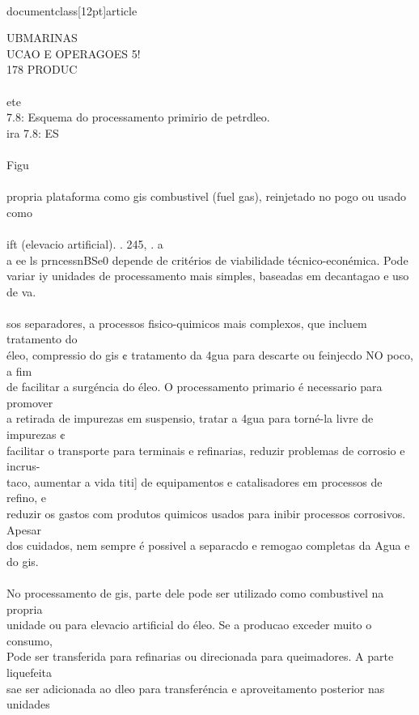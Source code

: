 \\documentclass[12pt]{article}
\begin{document}
{UBMARINAS\\
UCAO E OPERAGOES 5!\\
178 PRODUC\\
\\
ete\\
7.8: Esquema do processamento primirio de petrdleo.\\
ira 7.8: ES\\
\\
Figu\\
\\
propria plataforma como gis combustivel (fuel gas), reinjetado no pogo ou usado como\\
\\
ift (elevacio artificial). . 245, . a\\
a ee ls prncessnBSe0 depende de critérios de viabilidade técnico-econémica. Pode\\
variar iy unidades de processamento mais simples, baseadas em decantagao e uso de va.\\
\\
sos separadores, a processos fisico-quimicos mais complexos, que incluem tratamento do\\
éleo, compressio do gis ¢ tratamento da 4gua para descarte ou feinjecdo NO poco, a fim\\
de facilitar a surgéncia do éleo. O processamento primario é necessario para promover\\
a retirada de impurezas em suspensio, tratar a 4gua para torné-la livre de impurezas ¢\\
facilitar o transporte para terminais e refinarias, reduzir problemas de corrosio e incrus-\\
taco, aumentar a vida titi] de equipamentos e catalisadores em processos de refino, e\\
reduzir os gastos com produtos quimicos usados para inibir processos corrosivos. Apesar\\
dos cuidados, nem sempre é possivel a separacdo e remogao completas da Agua e do gis.\\
\\
No processamento de gis, parte dele pode ser utilizado como combustivel na propria\\
unidade ou para elevacio artificial do éleo. Se a producao exceder muito o consumo,\\
Pode ser transferida para refinarias ou direcionada para queimadores. A parte liquefeita\\
sae ser adicionada ao dleo para transferéncia e aproveitamento posterior nas unidades\\
}
\end{document}

